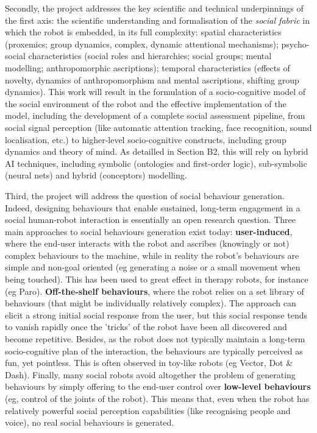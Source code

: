 \documentclass[11pt]{report}
\begin{document}
Secondly, the project addresses the key scientific and technical underpinnings
of the first axis:  the scientific understanding and formalisation of the
\emph{social fabric} in which the robot is embedded, in its full complexity:
spatial characteristics (proxemics; group dynamics, complex, dynamic attentional
mechanisms); psycho-social characteristics (social roles and hierarchies; social
groups; mental modelling; anthropomorphic ascriptions); temporal characteristics
(effects of novelty, dynamics of anthropomorphism and mental ascriptions,
shifting group dynamics). This work will result in the formulation of a
socio-cognitive model of the social environment of the robot and the effective
implementation of the model, including the development of a complete social
assessment pipeline, from social signal perception (like automatic attention
tracking, face recognition, sound localisation, etc.) to higher-level
socio-cognitive constructs, including group dynamics and theory of mind. As
detailled in Section B2, this will rely on hybrid AI techniques, including
symbolic (ontologies and first-order logic), sub-symbolic (neural nets) and
hybrid (conceptors) modelling.

Third, the project will address the question of social behaviour generation.
Indeed, designing behaviours that enable sustained, long-term engagement in a
social human-robot interaction is essentially an open research question. Three
main approaches to social behaviours generation exist today:
\textbf{user-induced}, where the end-user interacts with the robot and ascribes
(knowingly or not) complex behaviours to the machine, while in reality the
robot's behaviours are simple and non-goal oriented (eg generating a noise or
a small movement when being touched). This has been used to great effect in
therapy robots, for instance (eg Paro). \textbf{Off-the-shelf behaviours}, where
the robot relies on a set library of behaviours (that might be individually
relatively complex). The approach can elicit a strong initial social response
from the user, but this social response tends to vanish rapidly once the
'tricks' of the robot have been all discovered and become repetitive.  Besides,
as the robot does not typically maintain a long-term socio-cognitive plan of the
interaction, the behaviours are typically perceived as fun, yet pointless. This is often
observed in toy-like robots (eg Vector, Dot \& Dash). Finally, many social
robots avoid altogether the problem of generating behaviours by simply offering
to the end-user control over \textbf{low-level behaviours} (eg, control of the
joints of the robot). This means that, even when the robot has relatively powerful
social perception capabilities (like recognising people and voice), no real
social behaviours is generated.
\end{document}
